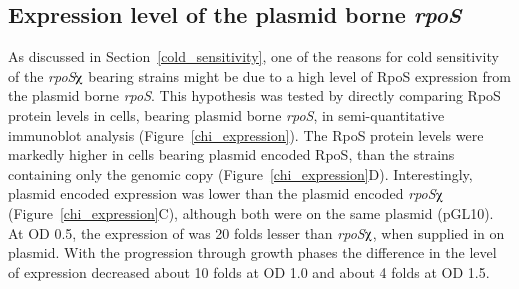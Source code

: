 \subsection{Expression level of the plasmid borne \emph{rpoS}}

As discussed in Section~\ref{cold_sensitivity}, one of the reasons
for cold sensitivity of the \emph{rpoS}$\chiup$ bearing strains
might be due to a high level of RpoS expression from the plasmid
borne \emph{rpoS}. This hypothesis was tested by directly
comparing RpoS protein levels in cells, bearing plasmid borne
\emph{rpoS}, in semi-quantitative immunoblot analysis
(Figure~\ref{chi_expression}). The RpoS protein levels were
markedly higher in cells bearing plasmid encoded RpoS, than the
strains containing only the genomic copy
(Figure~\ref{chi_expression}D)\@. Interestingly, plasmid encoded
\lzsig{} expression was lower than the plasmid encoded
\emph{rpoS}$\chiup$ (Figure~\ref{chi_expression}C), although both
were on the same plasmid (pGL10). At OD 0.5, the
expression of \lzsig{} was 20 folds lesser than
\emph{rpoS}$\chiup$, when supplied in  on plasmid. With
the progression through growth phases the difference in the level
of expression decreased about 10 folds at OD 1.0 and
about 4 folds at OD 1.5.


